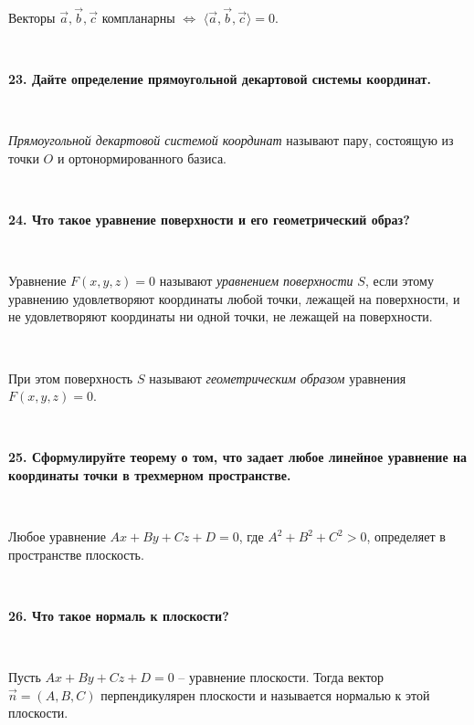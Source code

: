 \documentclass{article}
\begin{document}
	{
		$\;$
		\setlength{\parindent}{0.4cm}
		\hangindent=0.4cm
		
		Векторы $\overrightarrow{a}, \overrightarrow{b}, \overrightarrow{c}$ компланарны $\Leftrightarrow$ $\langle\overrightarrow{a}, \overrightarrow{b},\overrightarrow{c}\rangle=0$.
		
		$\;$
		\setlength{\parindent}{0cm}
		\hangindent=0cm
	}
	
	\textbf{23. Дайте определение прямоугольной декартовой системы координат.}
	
	{
		$\;$
		\setlength{\parindent}{0.4cm}
		\hangindent=0.4cm
		
		\textit{Прямоугольной декартовой системой координат} называют пару, состоящую из точки $O$ и ортонормированного базиса.
		
		$\;$
		\setlength{\parindent}{0cm}
		\hangindent=0cm
	}
	
	\textbf{24. Что такое уравнение поверхности и его геометрический образ?}
	
	{
		$\;$
		\setlength{\parindent}{0.4cm}
		\hangindent=0.4cm
		
		Уравнение $F(x, y, z)=0$ называют \textit{уравнением поверхности} $S$, если этому уравнению удовлетворяют координаты любой точки, лежащей на поверхности, и не удовлетворяют координаты ни одной точки, не лежащей на поверхности.
		
		$\;$
		
		При этом поверхность $S$ называют \textit{геометрическим образом} уравнения $F(x, y, z)=0$.
		
		$\;$
		\setlength{\parindent}{0cm}
		\hangindent=0cm
	}
	
	\textbf{25. Сформулируйте теорему о том, что задает любое линейное уравнение на координаты точки в трехмерном пространстве.}
	
	{
		$\;$
		\setlength{\parindent}{0.4cm}
		\hangindent=0.4cm
		
		 Любое уравнение $Ax+By+Cz+D=0$, где $A^2+B^2+C^2>0$, определяет в пространстве плоскость.
		
		$\;$
		\setlength{\parindent}{0cm}
		\hangindent=0cm
	}
	
	\textbf{26. Что такое нормаль к плоскости?}
	
	{
		$\;$
		\setlength{\parindent}{0.4cm}
		\hangindent=0.4cm
		
		Пусть $Ax+By+Cz+D=0$ -- уравнение плоскости. Тогда вектор $\overrightarrow{n}=(A, B, C)$ 
		перпендикулярен плоскости и называется нормалью к этой плоскости.
		
		$\;$
		\setlength{\parindent}{0cm}
		\hangindent=0cm
	}
	
\end{document}
